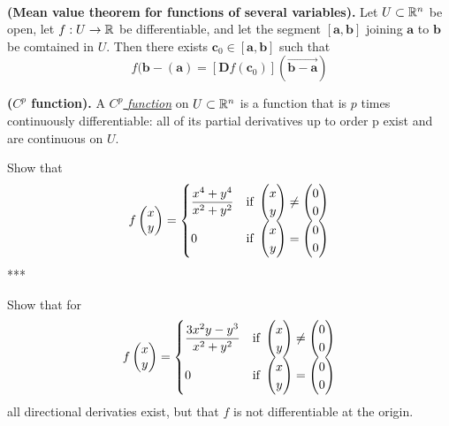 \\

\begin{theorem}
  \textbf{(Mean value theorem for functions of several variables).} Let $U \subset \mathbb{R}^n$ be open, let $f : U \to \mathbb{R}$ be differentiable, and let the segment $[\bm{a},\bm{b}]$ joining $\bm{a}$ to $\bm{b}$ be comtained in $U$. Then there exists $\bm{c}_0\in [\bm{a},\bm{b}]$ such that
  \[f(\bm{b}-(\bm{a})= [\bm{D}f(\bm{c}_0)](\vec{\bm{b}-\bm{a}})\]
\end{theorem}

\begin{defn}
\textbf{($C^p$ function).} A \ul{$C^p$ \emph{function}} on $U\subset \mathbb{R}^n$ is a function that is $p$ times continuously differentiable: all of its partial derivatives up to order p exist and are continuous on $U$.
\end{defn}

Show that
\[f\begin{pmatrix} x \\ y \end{pmatrix} = \begin{cases} \displaystyle
\frac{x^4+y^4}{x^2+y^2} & \text{if } \begin{pmatrix} x \\ y \end{pmatrix}\neq \begin{pmatrix} 0 \\ 0 \end{pmatrix} \\
0 & \text{if } \begin{pmatrix} x \\ y \end{pmatrix} = \begin{pmatrix} 0 \\ 0 \end{pmatrix}\end{cases}
\]
***


  Show that for
  \[f\begin{pmatrix} x \\ y \end{pmatrix} = \begin{cases}
  \displaystyle \frac{3x^2y - y^3}{x^2+y^2} & \text{if } \begin{pmatrix} x \\ y \end{pmatrix} \neq \begin{pmatrix} 0 \\ 0 \end{pmatrix} \\
  0 & \text{if } \begin{pmatrix} x \\ y \end{pmatrix} = \begin{pmatrix} 0 \\ 0 \end{pmatrix}
  \end{cases}\]
  all directional derivaties exist, but that $f$ is not differentiable at the origin.
